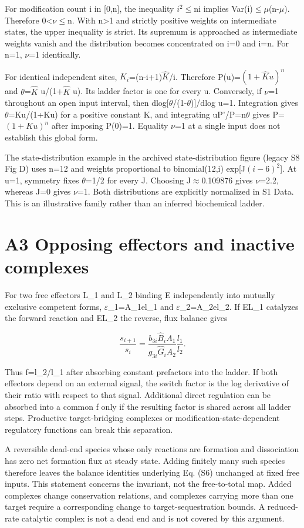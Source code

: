 \documentclass[11pt]{article}
\begin{document}
For modification count i in [0,n], the inequality $i^2$$\le$ni implies Var(i)$\le$$\mu$(n-$\mu$). Therefore 0<$\nu$$\le$n. With n>1 and strictly positive weights on intermediate states, the upper inequality is strict. Its supremum is approached as intermediate weights vanish and the distribution becomes concentrated on i=0 and i=n. For n=1, $\nu$=1 identically.


For identical independent sites, $K_i$=(n-i+1)$\widehat K$/i. Therefore P(u)=$(1+\widehat K u)^n$ and $\theta$=$\widehat K$ u/(1+$\widehat K$ u). Its ladder factor is one for every u. Conversely, if $\nu$=1 throughout an open input interval, then dlog[$\theta$/(1-$\theta$)]/dlog u=1. Integration gives $\theta$=Ku/(1+Ku) for a positive constant K, and integrating uP'/P=n$\theta$ gives P=$(1+Ku)^n$ after imposing P(0)=1. Equality $\nu$=1 at a single input does not establish this global form.


The state-distribution example in the archived state-distribution figure (legacy S8 Fig D) uses n=12 and weights proportional to binomial(12,i) exp[J$(i-6)^2$]. At u=1, symmetry fixes $\theta$=1/2 for every J. Choosing J$\approx$0.109876 gives $\nu$=2.2, whereas J=0 gives $\nu$=1. Both distributions are explicitly normalized in S1 Data. This is an illustrative family rather than an inferred biochemical ladder.


\section*{A3 Opposing effectors and inactive complexes}

For two free effectors L\_1 and L\_2 binding E independently into mutually exclusive competent forms, $\varepsilon$\_1=A\_1el\_1 and $\varepsilon$\_2=A\_2el\_2. If EL\_1 catalyzes the forward reaction and EL\_2 the reverse, flux balance gives


\[
\frac{s_{i+1}}{s_i}=\frac{b_{3i}\widehat B_i A_1}{g_{3i}\widehat G_i A_2}\frac{l_1}{l_2}. \tag{S9}
\]

Thus f=l\_2/l\_1 after absorbing constant prefactors into the ladder. If both effectors depend on an external signal, the switch factor is the log derivative of their ratio with respect to that signal. Additional direct regulation can be absorbed into a common f only if the resulting factor is shared across all ladder steps. Productive target-bridging complexes or modification-state-dependent regulatory functions can break this separation.


A reversible dead-end species whose only reactions are formation and dissociation has zero net formation flux at steady state. Adding finitely many such species therefore leaves the balance identities underlying Eq. (S6) unchanged at fixed free inputs. This statement concerns the invariant, not the free-to-total map. Added complexes change conservation relations, and complexes carrying more than one target require a corresponding change to target-sequestration bounds. A reduced-rate catalytic complex is not a dead end and is not covered by this argument.
\end{document}
